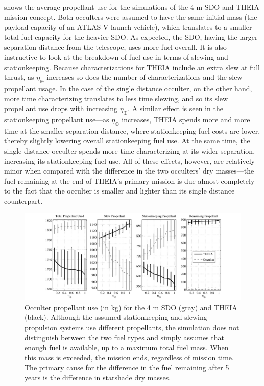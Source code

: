   shows the average propellant use for the simulations of the 4 m SDO and THEIA mission concept.  Both occulters were assumed to have the same initial mass (the payload capacity of an ATLAS V launch vehicle), which translates to a smaller total fuel capacity for the heavier SDO.  As expected, the SDO, having the larger separation distance from the telescope, uses more fuel overall.  It is also instructive to look at the breakdown of fuel use in terms of slewing and stationkeeping.  Because characterizations for THEIA include an extra slew at full thrust, as $\eta_\oplus$ increases so does the number of characterizations and the slew propellant usage.  In the case of the single distance occulter, on the other hand, more time characterizing translates to less time slewing, and so its slew propellant use drops with increasing $\eta_\oplus$.  A similar effect is seen in the stationkeeping propellant use---as $\eta_\oplus$ increases, THEIA spends more and more time at the smaller separation distance, where stationkeeping fuel costs are lower, thereby slightly lowering overall stationkeeping fuel use.  At the same time, the single distance occulter spends more time characterizing at its wider separation, increasing its stationkeeping fuel use.  All of these effects, however, are relatively minor when compared with the difference in the two occulters' dry masses---the fuel remaining at the end of THEIA's primary mission is due almost completely to the fact that the occulter is smaller and lighter than its single distance counterpart.
\begin{figure}[ht]
\centering
 \includegraphics[width=6in,clip=true,trim=0.8in 0in 0.75in 0in]{./figures/theiaFuel}
 \caption[Occulter propellant use]{ \label{fig:fuel_use} Occulter propellant use (in kg) for the 4 m SDO (gray) and THEIA (black). Although the assumed stationkeeping and slewing propulsion systems use different propellants, the simulation does not distinguish between the two fuel types and simply assumes that enough fuel is available, up to a maximum total fuel mass.  When this mass is exceeded, the mission ends, regardless of mission time. The primary cause for the difference in the fuel remaining after 5 years is the difference in starshade dry masses.}
 \end{figure}
 

